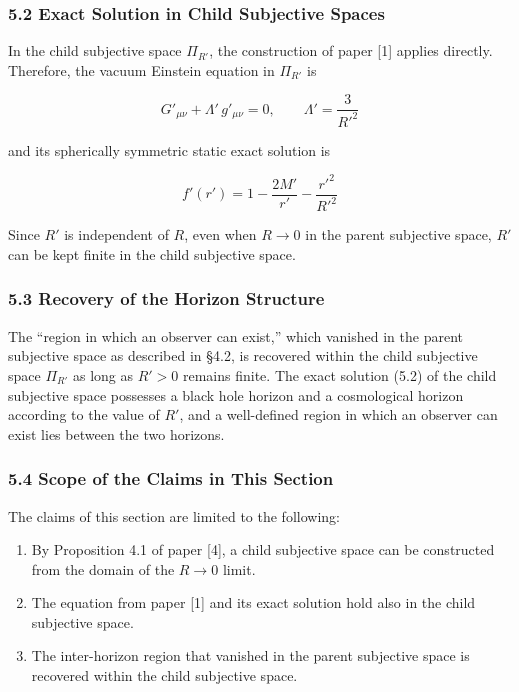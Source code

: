 \documentclass[a4paper,11pt]{article}
\theoremstyle{definition}
\providecommand{\tightlist}{\setlength{\itemsep}{0pt}\setlength{\parskip}{0pt}}
\begin{document}
\subsubsection{5.2 Exact Solution in Child Subjective
Spaces}\label{exact-solution-in-child-subjective-spaces}

In the child subjective space \(\Pi_{R'}\), the construction of paper
{[}1{]} applies directly. Therefore, the vacuum Einstein equation in
\(\Pi_{R'}\) is

\[G'_{\mu\nu} + \Lambda'\, g'_{\mu\nu} = 0, \qquad \Lambda' = \frac{3}{R'^2} \tag{5.1}\]

and its spherically symmetric static exact solution is

\[f'(r') = 1 - \frac{2M'}{r'} - \frac{r'^2}{R'^2} \tag{5.2}\]

Since \(R'\) is independent of \(R\), even when \(R \to 0\) in the
parent subjective space, \(R'\) can be kept finite in the child
subjective space.

\subsubsection{5.3 Recovery of the Horizon
Structure}\label{recovery-of-the-horizon-structure}

The ``region in which an observer can exist,'' which vanished in the
parent subjective space as described in §4.2, is recovered within the
child subjective space \(\Pi_{R'}\) as long as \(R' > 0\) remains
finite. The exact solution (5.2) of the child subjective space possesses
a black hole horizon and a cosmological horizon according to the value
of \(R'\), and a well-defined region in which an observer can exist lies
between the two horizons.

\subsubsection{5.4 Scope of the Claims in This
Section}\label{scope-of-the-claims-in-this-section-1}

The claims of this section are limited to the following:

\begin{enumerate}
\def\labelenumi{\arabic{enumi}.}
\tightlist
\item
  By Proposition 4.1 of paper {[}4{]}, a child subjective space can be
  constructed from the domain of the \(R \to 0\) limit.
\item
  The equation from paper {[}1{]} and its exact solution hold also in
  the child subjective space.
\item
  The inter-horizon region that vanished in the parent subjective space
  is recovered within the child subjective space.
\end{enumerate}
\end{document}
